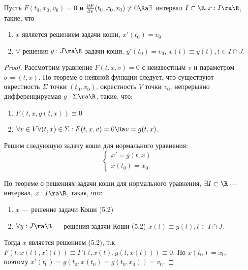 \begin{theorem}
    Пусть \(F(t_0, x_0, v_0) = 0\) и \(\frac{\partial F}{\partial v}(t_0, x_0, v_0) \ne 0 \Ra \exists\) интервал \(I \subset \R, x: I \ra \R\), такие, что 
    \begin{enumerate}
        \item \(x\) является решением задачи коши, \(x'(t_0) = v_0\)
        \item \(\forall\) решения \(y: J \ra \R\) задачи коши, \(y'(t_0) = v_0\), \(x(t) \equiv y(t), t \in I \cap J\).
    \end{enumerate}
\end{theorem}
\begin{proof}
    Рассмотрим уравнение \(F(t, x, v) = 0\) с неизвестным \(v\) и параметром \(\sigma = (t, x)\). По теореме о неявной функции следует, что существуют окрестность \(\Sigma\) точки \((t_0, x_0)\), окрестность \(V\) точки \(v_0\), непрерывно дифференцируемая \(g: \Sigma \ra \R\), такие, что:
    \begin{enumerate}
        \item \(F(t, x, g(t, x)) \equiv 0\)
        \item \(\forall v \in V \forall (t, x) \in \Sigma: F(t, x, v) = 0 \Ra v = g(t, x)\).
    \end{enumerate}
    Решим следующую задачу коши для нормального уравнения:
    \begin{equation}
        \begin{cases}
            x' = g(t, x) \\
            x(t_0) = x_0
        \end{cases}
    \end{equation}

    По теореме о решениях задачи коши для нормального уравнения, \(\exists I \subset \R\) --- интервал, \(x: I \ra \R\), такая, что:
    \begin{enumerate}
        \item \(x\) --- решение задачи Коши (5.2)
        \item \(\forall y: J \ra \R\) --- решения задачи Коши (5.2) \(x(t) \equiv y(t), t \in I \cap J\).
    \end{enumerate}
    Тогда \(x\) является решением (5.2), т.к. \(F(t, x(t), x'(t)) \equiv F(t, x(t), g(t, x(t))) \equiv 0\). Но \(x(t_0) = x_0\), поэтому \(x'(t_0) = g(t_0, x(t_0) = g(t_0, x_0)) = v_0\).


\end{proof}
